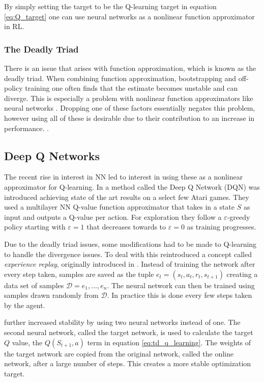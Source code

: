 By simply setting the target to be the Q-learning target in equation \ref{eq:Q_target} one can use neural networks as a nonlinear function approximator in RL.

\subsubsection{The Deadly Triad}

There is an issue that arises with function approximation, which is known as the deadly triad. When combining function approximation, bootstrapping and off-policy training one often finds that the estimate becomes unstable and can diverge. This is especially a problem with nonlinear function approximators like neural networks \citep{mnih_2013}. Dropping one of these factors essentially negates this problem, however using all of these is desirable due to their contribution to an increase in performance. \cite[p.~264-265]{sutton_barto_2018}.

\subsection{Deep Q Networks}

The recent rise in interest in NN led to interest in using these as a nonlinear approximator for Q-learning. In \cite{mnih_2013} a method called the Deep Q Network (DQN) was introduced achieving state of the art results on a select few Atari games. They used a multilayer NN Q-value function approximator that takes in a state $S$ as input and outputs a Q-value per action. For exploration they follow a $\varepsilon$-greedy policy starting with $\varepsilon=1$ that decreases towards to $\varepsilon=0$ as training progresses.

Due to the deadly triad issues, some modifications had to be made to Q-learning to handle the divergence issues. To deal with this \cite{mnih_2013} reintroduced a concept called \textit{experience replay}, originally introduced in \cite{lin_1993}. Instead of training the network after every step taken, samples are saved as the tuple $e_t=(s_t, a_t,r_t, s_{t+1})$ creating a data set of samples $\mathcal{D} = e_1,...,e_n$. The neural network can then be trained using samples drawn randomly from $\mathcal{D}$. In practice this is done every few steps taken by the agent.

\cite{mnih_2015} further increased stability by using two neural networks instead of one. The second neural network, called the target network, is used to calculate the target $Q$ value, the $Q(S_{t+1}, a)$ term in equation \ref{eq:td_q_learning}. The weights of the target network are copied from the original network, called the online network, after a large number of steps. This creates a more stable optimization target. 

